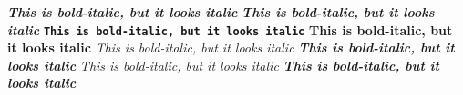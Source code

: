 \documentclass{article}
\begin{document}
\textit {\textbf {This is bold-italic, but it looks italic}}
\textbf{\textit{This is bold-italic, but it looks italic}}
\textbf{\texttt{This is bold-italic, but it looks italic}}
\textbf{\textbf{This is bold-italic, but it looks italic}}
\textit{\textit{This is bold-italic, but it looks italic}}
\textbf{\emph{This is bold-italic, but it looks italic}}
\textit{\emph{This is bold-italic, but it looks italic}}
\emph{\textbf{This is bold-italic, but it looks italic}}
\end{document}

